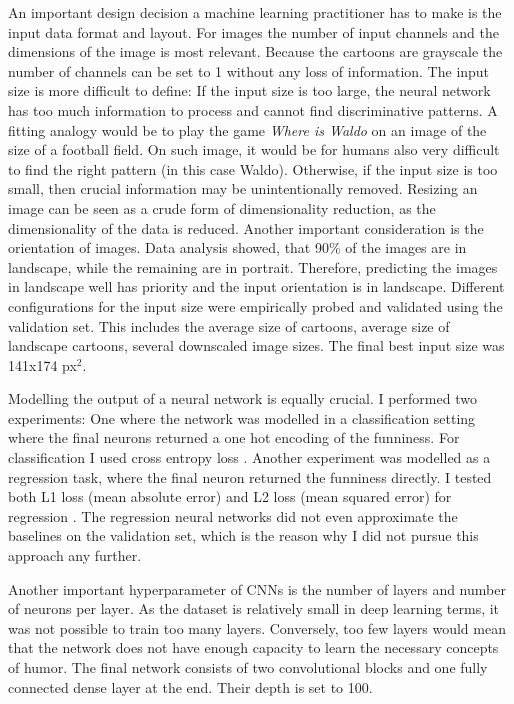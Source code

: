 \documentclass[draft,final,oneside]{vutinfth} %
\begin{document}
An important design decision a machine learning practitioner has to make is the input data format and layout. For images the number of input channels and the dimensions of the image is most relevant. Because the cartoons are grayscale the number of channels can be set to 1 without any loss of information. The input size is more difficult to define: If the input size is too large, the neural network has too much information to process and cannot find discriminative patterns. A fitting analogy would be to play the game \textit{Where is Waldo} on an image of the size of a football field. On such image, it would be for humans also very difficult to find the right pattern (in this case Waldo). Otherwise, if the input size is too small, then crucial information may be unintentionally removed. Resizing an image can be seen as a crude form of dimensionality reduction, as the dimensionality of the data is reduced. Another important consideration is the orientation of images. Data analysis showed, that 90\% of the images are in landscape, while the remaining are in portrait. Therefore, predicting the images in landscape well has priority and the input orientation is in landscape. Different configurations for the input size were empirically probed and validated using the validation set. This includes the average size of cartoons, average size of landscape cartoons, several downscaled image sizes. The final best input size was 141x174 px$^2$.

Modelling the output of a neural network is equally crucial. I performed two experiments: One where the network was modelled in a classification setting where the final neurons returned a one hot encoding of the funniness. For classification I used cross entropy loss \cite{crossentropyloss}. Another experiment was modelled as a  regression task, where the final neuron returned the funniness directly. I tested both L1 loss (mean absolute error) and L2 loss (mean squared error) for regression \cite{lossfunctions}. The regression neural networks did not even approximate the baselines on the validation set, which is the reason why I did not pursue this approach any further.

Another important hyperparameter of CNNs is the number of layers and number of neurons per layer. As the dataset is relatively small in deep learning terms, it was not possible to train too many layers. Conversely, too few layers would mean that the network does not have enough capacity to learn the necessary concepts of humor. The final network consists of two convolutional blocks and one fully connected dense layer at the end. Their depth is set to 100.
\end{document}
